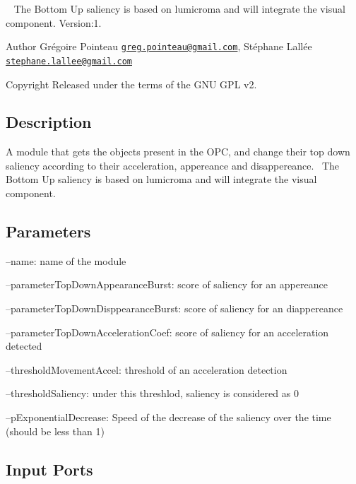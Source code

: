 ~\newline
The Bottom Up saliency is based on lumicroma and will integrate the visual component. Version\+:1. \begin{DoxyAuthor}{Author}
Grégoire Pointeau \href{mailto:greg.pointeau@gmail.com}{\tt greg.\+pointeau@gmail.\+com}, Stéphane Lallée \href{mailto:stephane.lallee@gmail.com}{\tt stephane.\+lallee@gmail.\+com} ~\newline
 
\end{DoxyAuthor}
\begin{DoxyCopyright}{Copyright}
Released under the terms of the G\+NU G\+PL v2. 
\end{DoxyCopyright}
\hypertarget{group__touchDetector_intro_sec}{}\subsection{Description}\label{group__touchDetector_intro_sec}
A module that gets the objects present in the O\+PC, and change their top down saliency according to their acceleration, appereance and disappereance.~\newline
 The Bottom Up saliency is based on lumicroma and will integrate the visual component.\hypertarget{group__touchDetector_parameters_sec}{}\subsection{Parameters}\label{group__touchDetector_parameters_sec}

\begin{DoxyItemize}
\item --name\+: name of the module
\item --parameter\+Top\+Down\+Appearance\+Burst\+: score of saliency for an appereance
\item --parameter\+Top\+Down\+Disppearance\+Burst\+: score of saliency for an diappereance
\item --parameter\+Top\+Down\+Acceleration\+Coef\+: score of saliency for an acceleration detected
\item --threshold\+Movement\+Accel\+: threshold of an acceleration detection
\item --threshold\+Saliency\+: under this threshlod, saliency is considered as 0
\item --p\+Exponential\+Decrease\+: Speed of the decrease of the saliency over the time (should be less than 1) 
\end{DoxyItemize}\hypertarget{group__touchDetector_inputports_sec}{}\subsection{Input Ports}\label{group__touchDetector_inputports_sec}

